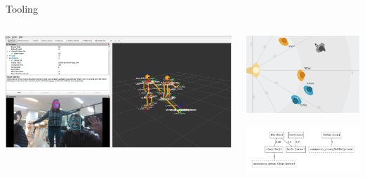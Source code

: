\documentclass[xcolor=table,aspectratio=169]{beamer}
\begin{document}
\begin{frame}{Tooling}



    \begin{columns}
        \begin{column}{0.6\linewidth}
    \includegraphics[width=0.8\linewidth]{ros4hri/screenshot.jpg}
        \end{column}
        \begin{column}{0.4\linewidth}
    \includegraphics[width=0.8\linewidth]{ros4hri/rqt_humans.png}
            \vspace{1em}

    \includegraphics[width=6cm]{ros4hri/human_graph.png}
        \end{column}
    \end{columns}
\end{frame}
\end{document}
